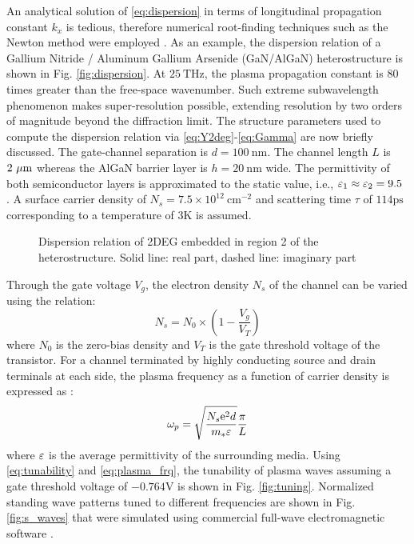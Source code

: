 \documentclass[11pt]{article}
\begin{document}
An analytical solution of \eqref{eq:dispersion} in terms of longitudinal propagation constant $k_x$ is tedious, therefore numerical root-finding techniques such as the Newton method were employed \cite{9780521880688}. As an example, the dispersion relation of a Gallium Nitride / Aluminum Gallium Arsenide (GaN/AlGaN) heterostructure is shown in Fig. \ref{fig:dispersion}. At $25~ \mathrm{THz}$, the plasma propagation constant is 80 times greater than the free-space wavenumber. Such extreme subwavelength phenomenon makes super-resolution possible, extending resolution by two orders of magnitude beyond the diffraction limit. The structure parameters used to compute the dispersion relation via \eqref{eq:Y2deg}-\eqref{eq:Gamma} are now briefly discussed. The gate-channel separation is $d = 100~\mathrm{nm}$. The channel length $L$ is $2~\mathrm{\mu m}$ whereas the AlGaN barrier layer is
$h = 20~ \mathrm{nm}$ wide. The permittivity of both semiconductor layers is approximated to the static value, i.e., $\varepsilon_1 \approx \varepsilon_2 = 9.5$ \cite{Muravjov2010}. A surface carrier density of $N_s = 7.5 \times 10^{12}~ \mathrm{cm}^{-2}$ and scattering time $\tau$ of $114 \mathrm{ps}$ corresponding to a temperature of $3 \mathrm{K}$ is assumed.
%
\begin{figure}[t!]
      \hfil
  \caption{Dispersion relation of 2DEG embedded in region 2 of the heterostructure. Solid line: real part, dashed line: imaginary part}
  \label{fig:simulation1}
\end{figure}
%
Through the gate voltage $V_g$, the electron density $N_s$ of the channel can be varied using the relation:
%
\begin{equation}
  N_s = N_0 \times(1 - \frac{V_g}{V_T})
  \label{eq:tunability}
\end{equation}
%
where $N_0$ is the zero-bias density and $V_T$ is the gate threshold voltage of the transistor. For a channel terminated by highly conducting source and drain terminals at each side, the plasma frequency as a function of carrier density is expressed as \cite{Popov2008}:
%
\begin{equation}
  \omega_p = \sqrt{\frac{N_s \mathrm{e}^2 d}{m_{\ast} \varepsilon}} \frac{\pi}{L}
  \label{eq:plasma_frq}
\end{equation}
%
where $\varepsilon$ is the average permittivity of the surrounding media. Using \eqref{eq:tunability} and \eqref{eq:plasma_frq}, the tunability of plasma waves assuming a gate threshold voltage of $-0.764 \mathrm{V}$ is shown in Fig. \ref{fig:tuning}. Normalized standing wave patterns tuned to different frequencies are shown in Fig. \ref{fig:s_waves} that were simulated using commercial full-wave electromagnetic software \cite{comsol}.
\end{document}
